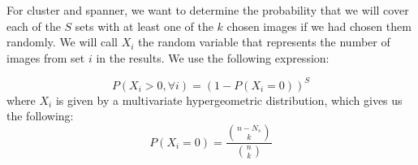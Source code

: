 For cluster and spanner, we want to determine the probability that we will cover each of the $S$ sets with at least one of the $k$ chosen images if we had chosen them randomly.  We will call $X_i$ the random variable that represents the number of images from set $i$ in the results.  We use the following expression:

\begin{equation}
	P( X_i > 0 , \forall i) = (1 - P(X_i = 0))^{S}
\end{equation}
where $X_i$ is given by a multivariate hypergeometric distribution, which gives us the following:
\begin{equation}
	P(X_i = 0) = \frac{{n-N_s \choose k}}{{n \choose k}}
\end{equation}
